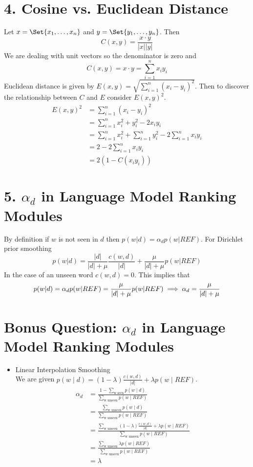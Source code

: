 \documentclass[paper=a4, fontsize=11pt]{jhwhw} %
\begin{document}
\section*{4. Cosine vs. Euclidean Distance}
\solution
Let $x = \Set{x_1, \ldots, x_n}$ and $y = \Set{y_1, \ldots, y_n}$. Then
$$C(x, y) = \frac{x\cdot y}{\lvert x\rvert \lvert y \rvert}$$
We are dealing with unit vectors so the denominator is zero and
$$C(x, y) = x \cdot y = \sum_{i = 1}^{n} x_iy_i$$
Euclidean distance is given by $E(x, y) = \sqrt{\sum_{i=1}^{n} (x_i - y_i)^2}$. Then to discover the relationship between $C$ and $E$ consider $E(x, y)^2$.
\begin{align*}
    E(x, y)^2 &= \sum_{i=1}^{n} (x_i - y_i)^2\\
              &= \sum_{i=1}^{n} x_i^2 + y_i^2 - 2x_iy_i\\
              &= \sum_{i=1}^{n} x_i^2 + \sum_{i=1}^{n}y_i^2 - 2\sum_{i=1}^{n}x_iy_i\\
              &= 2 - 2\sum_{i=1}^{n}x_iy_i\\
              &= 2(1 - C(x_iy_i))
\end{align*}
\section*{5. $\alpha_d$ in Language Model Ranking Modules}
\solution
By definition if $w$ is not seen in $d$ then $p(w|d) = \alpha_d p(w|REF)$. For Dirichlet prior smoothing 
$$p(w|d) = \frac{\lvert d\rvert}{\lvert d \rvert + \mu}\frac{c(w, d)}{\lvert d\rvert} + \frac{\mu}{\lvert d\rvert + \mu}p(w|REF)$$
In the case of an unseen word $c(w, d) = 0$. This implies that
$$p(w|d) = \alpha_d p(w|REF) = \frac{\mu}{\lvert d\rvert + \mu}p(w|REF)\\
\implies \alpha_d = \frac{\mu}{\lvert d\rvert + \mu}$$

\section*{Bonus Question: $\alpha_d$ in Language Model Ranking Modules}
\solution
\begin{itemize}
    \item Linear Interpolation Smoothing\\
        We are given $p(w\mid d) = (1-\lambda)\frac{c(w,d)}{\lvert d\rvert} + \lambda p(w\mid REF)$.
        \begin{align*}
            \alpha_d &= \frac{1 - \sum_{\text{w seen}} p(w\mid d)}{\sum_{\text{w unseen}} p(w\mid REF)}\\
                     &= \frac{\sum_{\text{w unseen}} p(w\mid d)}{\sum_{\text{w unseen}} p(w\mid REF)}\\
                     &= \frac{\sum_{\text{w unseen}} (1-\lambda)\frac{c(w,d)}{\lvert d\rvert} + \lambda p(w\mid REF)}{\sum_{\text{w unseen}} p(w\mid REF)}\\
                     &= \frac{\sum_{\text{w unseen}} \lambda p(w\mid REF)}{\sum_{\text{w unseen}} p(w\mid REF)}\\
                     &= \lambda
        \end{align*}
\end{itemize}
\end{document}
